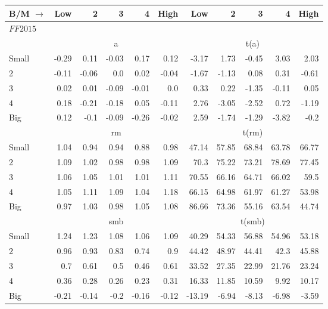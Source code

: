 

\begin{table}[!ht]
\centering
\begin{tabular}{lrrrrrrrrrr}
  \toprule
  B/M $\rightarrow$ & Low & 2 & 3 & 4 & High & Low & 2 & 3 & 4 & High \\ 
  \toprule
  \multicolumn{9}{l}{$FF2015$} \\

  

      & \multicolumn{5}{c}{a} & \multicolumn{5}{c}{t(a)} \\
    \cmidrule(r){2-6} \cmidrule(r){7-11}
      Small  & -0.29  & 0.11  & -0.03  & 0.17  & 0.12   & -3.17  & 1.73  & -0.45  & 3.03  & 2.03  \\
          2  & -0.11  & -0.06  & 0.0  & 0.02  & -0.04   & -1.67  & -1.13  & 0.08  & 0.31  & -0.61  \\
          3  & 0.02  & 0.01  & -0.09  & -0.01  & 0.0   & 0.33  & 0.22  & -1.35  & -0.11  & 0.05  \\
          4  & 0.18  & -0.21  & -0.18  & 0.05  & -0.11   & 2.76  & -3.05  & -2.52  & 0.72  & -1.19  \\
      Big    & 0.12  & -0.1  & -0.09  & -0.26  & -0.02   & 2.59  & -1.74  & -1.29  & -3.82  & -0.2  \\

  

      & \multicolumn{5}{c}{rm} & \multicolumn{5}{c}{t(rm)} \\
    \cmidrule(r){2-6} \cmidrule(r){7-11}
      Small  & 1.04  & 0.94  & 0.94  & 0.88  & 0.98   & 47.14  & 57.85  & 68.84  & 63.78  & 66.77  \\
          2  & 1.09  & 1.02  & 0.98  & 0.98  & 1.09   & 70.3  & 75.22  & 73.21  & 78.69  & 77.45  \\
          3  & 1.06  & 1.05  & 1.01  & 1.01  & 1.11   & 70.55  & 66.16  & 64.71  & 66.02  & 59.5  \\
          4  & 1.05  & 1.11  & 1.09  & 1.04  & 1.18   & 66.15  & 64.98  & 61.97  & 61.27  & 53.98  \\
      Big    & 0.97  & 1.03  & 0.98  & 1.05  & 1.08   & 86.66  & 73.36  & 55.16  & 63.54  & 44.74  \\

  

      & \multicolumn{5}{c}{smb} & \multicolumn{5}{c}{t(smb)} \\
    \cmidrule(r){2-6} \cmidrule(r){7-11}
      Small  & 1.24  & 1.23  & 1.08  & 1.06  & 1.09   & 40.29  & 54.33  & 56.88  & 54.96  & 53.18  \\
          2  & 0.96  & 0.93  & 0.83  & 0.74  & 0.9   & 44.42  & 48.97  & 44.41  & 42.3  & 45.88  \\
          3  & 0.7  & 0.61  & 0.5  & 0.46  & 0.61   & 33.52  & 27.35  & 22.99  & 21.76  & 23.24  \\
          4  & 0.36  & 0.28  & 0.26  & 0.23  & 0.31   & 16.33  & 11.85  & 10.59  & 9.92  & 10.17  \\
      Big    & -0.21  & -0.14  & -0.2  & -0.16  & -0.12   & -13.19  & -6.94  & -8.13  & -6.98  & -3.59  \\


\end{tabular}
\end{table}
